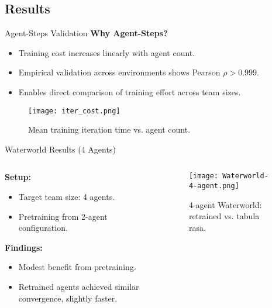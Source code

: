 \subsection{Results}


\begin{frame}{Agent-Steps Validation}
    \textbf{Why Agent-Steps?}
    \begin{itemize}
        \item Training cost increases linearly with agent count.
        \item Empirical validation across environments shows Pearson $\rho > 0.999$.
        \item Enables direct comparison of training effort across team sizes.
    \end{itemize}
    \begin{center}
        \begin{figure}
            \texttt{[image: iter\_cost.png]}
            \caption{Mean training iteration time vs. agent count.}
            \label{fig:agent_steps_costs}
        \end{figure}
    \end{center}
\end{frame}

\begin{frame}{Waterworld Results (4 Agents)}
    \begin{columns}
        \begin{column}{0.35\linewidth}
            \textbf{Setup:}
            \begin{itemize}
                \item Target team size: 4 agents.
                \item Pretraining from 2-agent configuration.
            \end{itemize}
            \textbf{Findings:}
            \begin{itemize}
                \item Modest benefit from pretraining.
                \item Retrained agents achieved similar convergence, slightly faster.
            \end{itemize}
        \end{column}
        \begin{column}{0.65\linewidth}
            \begin{figure}
                \texttt{[image: Waterworld-4-agent.png]}
                \caption{4-agent Waterworld: retrained vs. tabula rasa.}
            \end{figure}
        \end{column}
    \end{columns}
\end{frame}

